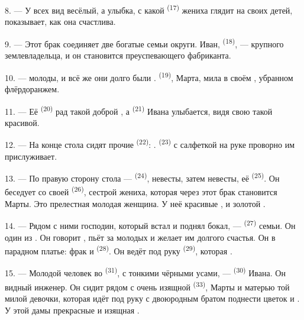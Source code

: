 \VUsaut{3.0mm}

8. --- У всех вид весёлый, а улыбка, с какой  \textsuperscript{(17)}
жениха глядит на своих детей, показывает, как она счастлива.

9. --- Этот брак соединяет две богатые семьи округи. Иван, 
\textsuperscript{(18)}, ---  крупного землевладельца, и он становится
 преуспевающего фабриканта.

10. ---  молоды, и всё же они долго были
.  \textsuperscript{(19)}, Марта, мила в
своём , убранном флёрдоранжем.

11. --- Её  \textsuperscript{(20)} рад такой доброй
, а  \textsuperscript{(21)} Ивана улыбается, видя
свою  такой красивой.

12. --- На конце стола сидят прочие  \textsuperscript{(22)}:
.  \textsuperscript{(23)} с
салфеткой на руке проворно им прислуживает.

\VUsaut{3.0mm}

13. --- По правую сторону стола ---  \textsuperscript{(24)},
 невесты, затем  невесты, её
 \textsuperscript{(25)}. Он беседует со своей  \textsuperscript{(26)}, сестрой жениха, которая через этот брак
становится  Марты. Это прелестная молодая женщина. У неё
красивые ,  и золотой
.

14. --- Рядом с ними господин, который встал и поднял бокал, ---
 \textsuperscript{(27)} семьи. Он один из .
Он говорит , пьёт за  молодых и желает им
долгого счастья. Он в парадном платье: фрак и 
\textsuperscript{(28)}. Он ведёт под руку  \textsuperscript{(29)},
которая .

15. --- Молодой человек во  \textsuperscript{(31)}, с тонкими
чёрными усами, ---  \textsuperscript{(30)} Ивана. Он видный
инженер. Он сидит рядом с очень изящной  \textsuperscript{(33)},
 Марты и матерью той милой девочки, которая идёт
под руку с двоюродным братом поднести цветок и 
. У этой дамы прекрасные  и изящная
.

